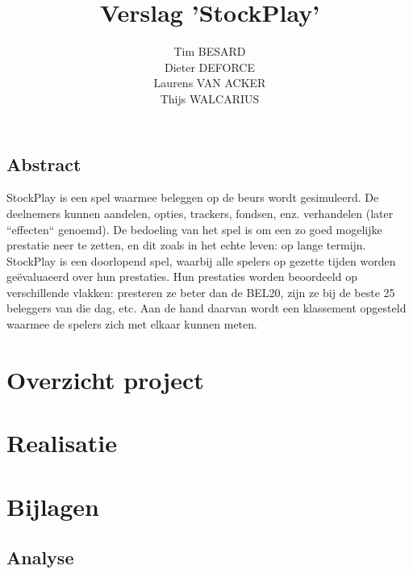 \documentclass[a4paper,oneside,final]{memoir}
\title{Verslag 'StockPlay'}
\author{
Tim BESARD\\
Dieter DEFORCE\\
Laurens VAN ACKER\\
Thijs WALCARIUS
}
\begin{document}
\maketitle
{}
\tableofcontents
{}


%
%

\chapter*{Abstract}
StockPlay is een spel waarmee beleggen op de beurs wordt gesimuleerd. De deelnemers kunnen aandelen, opties, trackers, fondsen, enz. verhandelen (later ``effecten`` genoemd). De bedoeling van het spel is om een zo goed mogelijke prestatie neer te zetten, en dit zoals in het echte leven: op lange termijn. StockPlay is een doorlopend spel, waarbij alle spelers op gezette tijden worden ge\"evaluaeerd over hun prestaties. Hun prestaties worden beoordeeld op verschillende vlakken: presteren ze beter dan de BEL20, zijn ze bij de beste 25 beleggers van die dag, etc. Aan de hand daarvan wordt een klassement opgesteld waarmee de spelers zich met elkaar kunnen meten.

\part{Overzicht project}
\label{pt:overzicht}


\part{Realisatie}
\label{pt:realisatie}


%

%
%

\part{Bijlagen}
\label{pt:bijlagen}
\appendix
\chapter{Analyse}
\label{pt:analyse}


\end{document}
